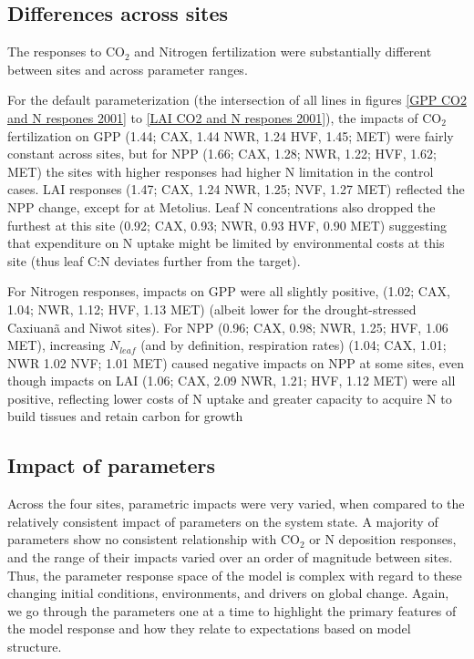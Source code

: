 \documentclass[draft,linenumbers]{agujournal}
\begin{document}
\subsection{Differences across sites}
The responses to CO$_{2}$ and Nitrogen fertilization were substantially different between sites and across parameter ranges. 

For the default parameterization (the intersection of all lines in figures \ref{GPP CO2 and N respones 2001} to \ref{LAI CO2 and N respones 2001}), the impacts of CO$_{2}$ fertilization on  GPP (1.44; CAX, 1.44 NWR, 1.24 HVF, 1.45; MET) were fairly constant across sites, but for NPP (1.66; CAX, 1.28; NWR, 1.22; HVF, 1.62; MET) the sites with higher responses had higher N limitation in the control cases.  LAI responses (1.47; CAX, 1.24 NWR, 1.25; NVF, 1.27 MET) reflected the NPP change, except for at Metolius. Leaf N concentrations also dropped the furthest at this site (0.92; CAX, 0.93; NWR, 0.93 HVF, 0.90 MET) suggesting that expenditure on N uptake might be limited by environmental costs at this site (thus leaf C:N deviates further from the target). 

For Nitrogen responses, impacts on  GPP were all slightly positive, (1.02; CAX, 1.04; NWR, 1.12; HVF, 1.13 MET) (albeit lower for the drought-stressed Caxiuan\~a and Niwot sites).  For NPP (0.96; CAX, 0.98; NWR, 1.25; HVF, 1.06 MET), increasing $N_{leaf}$ (and by definition, respiration rates) (1.04; CAX, 1.01; NWR 1.02 NVF; 1.01 MET) caused negative impacts on NPP at some sites, even though impacts on LAI (1.06; CAX, 2.09 NWR, 1.21; HVF, 1.12 MET) were all positive, reflecting lower costs of N uptake and greater capacity to acquire N to build tissues and retain carbon for growth  

\subsection{Impact of parameters}
Across the four sites, parametric impacts were very varied, when compared to the relatively consistent impact of parameters on the system state. A majority of parameters show no consistent relationship with CO$_{2}$ or N deposition responses, and the range of their impacts varied over an order of magnitude between sites. Thus, the parameter response space of the model is complex with regard to these changing initial conditions, environments, and drivers on global change. Again, we go through the parameters one at a time to highlight the primary features of the model response and how they relate to expectations based on model structure. 
\end{document}
